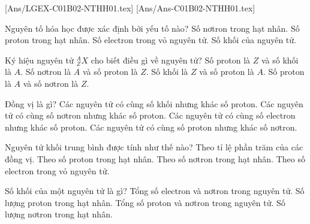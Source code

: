 
 [Ans/LGEX-C01B02-NTHH01.tex]
 [Ans/Ans-C01B02-NTHH01.tex]
 \hienthiloigiaiex
\begin{ex}%
	Nguyên tố hóa học được xác định bởi yếu tố nào?
	\choice
	{Số nơtron trong hạt nhân.}
	{\True Số proton trong hạt nhân.}
	{Số electron trong vỏ nguyên tử.}
	{Số khối của nguyên tử.}
\end{ex}
\begin{ex}%
	Ký hiệu nguyên tử $_{Z}^{A}X$ cho biết điều gì về nguyên tử?
	\choice
	{\True Số proton là $Z$ và số khối là $A$.}
	{Số nơtron là $A$ và số proton là $Z$.}
	{Số khối là $Z$ và số proton là $A$.}
	{Số proton là $A$ và số nơtron là $Z$.}
\end{ex}
\begin{ex}%
	Đồng vị là gì?
	\choice
	{Các nguyên tử có cùng số khối nhưng khác số proton.}
	{Các nguyên tử có cùng số nơtron nhưng khác số proton.}
	{Các nguyên tử có cùng số electron nhưng khác số proton.}
	{\True Các nguyên tử có cùng số proton nhưng khác số nơtron.}
\end{ex}
\begin{ex}%
	Nguyên tử khối trung bình được tính như thế nào?
	\choice
	{\True Theo tỉ lệ phần trăm của các đồng vị.}
	{Theo số proton trong hạt nhân.}
	{Theo số nơtron trong hạt nhân.}
	{Theo số electron trong vỏ nguyên tử.}
\end{ex}
\begin{ex}%
	Số khối của một nguyên tử là gì?
	\choice
	{Tổng số electron và nơtron trong nguyên tử.}
	{Số lượng proton trong hạt nhân.}
	{\True Tổng số proton và nơtron trong nguyên tử.}
	{Số lượng nơtron trong hạt nhân.}
\end{ex}
